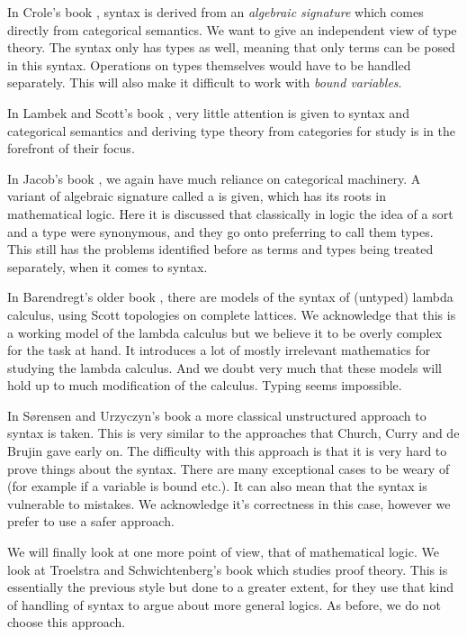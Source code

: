 In Crole's book \cite{CroleRoyL1993Cft}, syntax is derived from an \textit{algebraic signature} which comes directly from categorical semantics. We want to give an independent view of type theory. The syntax only has types as well, meaning that only terms can be posed in this syntax. Operations on types themselves would have to be handled separately. This will also make it difficult to work with \textit{bound variables}.

In Lambek and Scott's book \cite{LambekJ1986Itho}, very little attention is given to syntax and categorical semantics and deriving type theory from categories for study is in the forefront of their focus.

In Jacob's book \cite{JacobsCLTT}, we again have much reliance on categorical machinery. A variant of algebraic signature called a  is given, which has its roots in mathematical logic. Here it is discussed that classically in logic the idea of a sort and a type were synonymous, and they go onto preferring to call them types. This still has the problems identified before as terms and types being treated separately, when it comes to syntax.

In Barendregt's older book \cite{barendregt1984lambda}, there are models of the syntax of (untyped) lambda calculus, using Scott topologies on complete lattices. We acknowledge that this is a working model of the lambda calculus but we believe it to be overly complex for the task at hand. It introduces a lot of mostly irrelevant mathematics for studying the lambda calculus. And we doubt very much that these models will hold up to much modification of the calculus. Typing seems impossible.

In S{\o}rensen and Urzyczyn's book \cite{Sorensen} a more classical unstructured approach to syntax is taken. This is very similar to the approaches that Church, Curry and de Brujin gave early on. The difficulty with this approach is that it is very hard to prove things about the syntax. There are many exceptional cases to be weary of (for example if a variable is bound etc.). It can also mean that the syntax is vulnerable to mistakes. We acknowledge it's correctness in this case, however we prefer to use a safer approach.

We will finally look at one more point of view, that of mathematical logic. We look at Troelstra and Schwichtenberg's book \cite{troelstra_schwichtenberg_2000} which studies proof theory. This is essentially the previous style but done to a greater extent, for they use that kind of handling of syntax to argue about more general logics. As before, we do not choose this approach.

